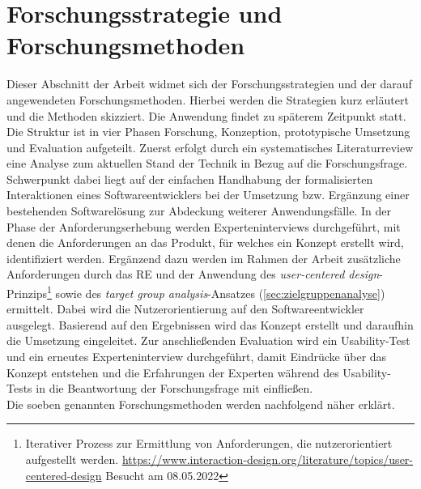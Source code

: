 \section{Forschungsstrategie und Forschungsmethoden}
\label{sec:forschungsstrategie}
    Dieser Abschnitt der Arbeit widmet sich der Forschungsstrategien und der darauf angewendeten Forschungsmethoden. 
    Hierbei werden die Strategien kurz erläutert und die Methoden skizziert. Die Anwendung findet zu 
    späterem Zeitpunkt statt. 
    \\
    Die Struktur ist in vier Phasen Forschung, Konzeption, prototypische Umsetzung und Evaluation aufgeteilt. Zuerst erfolgt durch ein 
    systematisches Literaturreview eine Analyse zum aktuellen Stand der Technik in Bezug auf die Forschungsfrage. 
    Schwerpunkt dabei liegt auf der einfachen Handhabung der formalisierten 
    Interaktionen eines Softwareentwicklers bei der Umsetzung bzw. Ergänzung einer bestehenden 
    Softwarelösung zur Abdeckung weiterer Anwendungsfälle. 
    In der Phase der Anforderungserhebung werden Experteninterviews durchgeführt, mit denen die Anforderungen an das Produkt, 
    für welches ein Konzept erstellt wird, identifiziert werden. Ergänzend dazu werden im Rahmen der Arbeit zusätzliche 
    Anforderungen durch das \ac{RE} und der Anwendung des \textit{user-centered design}-Prinzips\footnote{Iterativer Prozess zur Ermittlung von Anforderungen, die nutzerorientiert aufgestellt werden. \url{https://www.interaction-design.org/literature/topics/user-centered-design} Besucht am 08.05.2022} 
    sowie des \textit{target group analysis}-Ansatzes (\ref{sec:zielgruppenanalyse}) ermittelt. Dabei wird die 
    Nutzerorientierung auf den Softwareentwickler ausgelegt. Basierend auf den Ergebnissen wird das Konzept erstellt und daraufhin die Umsetzung eingeleitet. 
    Zur anschließenden Evaluation wird ein Usability-Test und ein erneutes Experteninterview durchgeführt, damit 
    Eindrücke über das Konzept entstehen und die Erfahrungen der Experten während des Usability-Tests 
    in die Beantwortung der Forschungsfrage mit einfließen.
    \\
    Die soeben genannten Forschungsmethoden werden nachfolgend näher erklärt.

